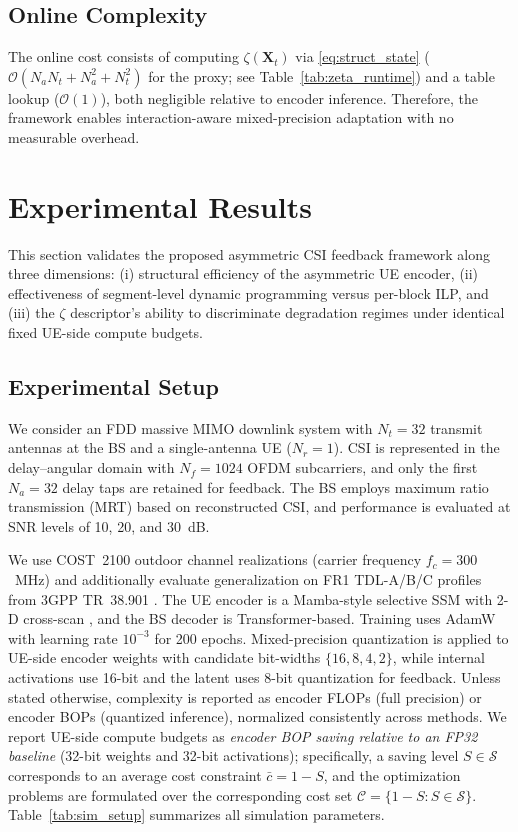 \documentclass[conference]{IEEEtran}
\begin{document}
\subsection{Online Complexity}
\label{subsec:online_complexity}

The online cost consists of computing $\zeta(\mathbf{X}_t)$ via \eqref{eq:struct_state} ($\mathcal{O}(N_a N_t + N_a^2 + N_t^2)$ for the proxy; see Table~\ref{tab:zeta_runtime}) and a table lookup ($\mathcal{O}(1)$), both negligible relative to encoder inference. Therefore, the framework enables interaction-aware mixed-precision adaptation with no measurable overhead.

\section{Experimental Results}
\label{sec:experiments}
This section validates the proposed asymmetric CSI feedback framework along three dimensions: (i) structural efficiency of the asymmetric UE encoder, (ii) effectiveness of segment-level dynamic programming versus per-block ILP, and (iii) the $\zeta$ descriptor's ability to discriminate degradation regimes under identical fixed UE-side compute budgets.

\subsection{Experimental Setup}
\label{subsec:exp_setup}
We consider an FDD massive MIMO downlink system with $N_t=32$ transmit antennas at the BS and a single-antenna UE ($N_r=1$). CSI is represented in the delay--angular domain with $N_f=1024$ OFDM subcarriers, and only the first $N_a=32$ delay taps are retained for feedback. The BS employs maximum ratio transmission (MRT) based on reconstructed CSI, and performance is evaluated at SNR levels of 10, 20, and 30~dB.

We use COST~2100 outdoor channel realizations \cite{COST2100} (carrier frequency $f_c=300$~MHz) and additionally evaluate generalization on FR1 TDL-A/B/C profiles from 3GPP TR~38.901 \cite{3GPP38901}. The UE encoder is a Mamba-style selective SSM with 2-D cross-scan \cite{Mamba, VMamba}, and the BS decoder is Transformer-based. Training uses AdamW with learning rate $10^{-3}$ for 200 epochs. Mixed-precision quantization is applied to UE-side encoder weights with candidate bit-widths $\{16,8,4,2\}$, while internal activations use 16-bit and the latent uses 8-bit quantization for feedback. Unless stated otherwise, complexity is reported as encoder FLOPs (full precision) or encoder BOPs (quantized inference), normalized consistently across methods. We report UE-side compute budgets as \emph{encoder BOP saving relative to an FP32 baseline} (32-bit weights and 32-bit activations); specifically, a saving level $S\in\mathcal{S}$ corresponds to an average cost constraint $\bar{c}=1-S$, and the optimization problems are formulated over the corresponding cost set $\mathcal{C}=\{1-S: S\in\mathcal{S}\}$. Table~\ref{tab:sim_setup} summarizes all simulation parameters.
\end{document}
